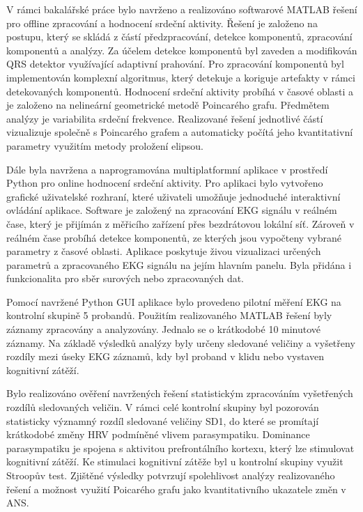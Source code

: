 V rámci bakalářské práce bylo navrženo a realizováno softwarové MATLAB
řešení pro offline zpracování a hodnocení srdeční aktivity. Řešení je založeno
na postupu, který se skládá z částí předzpracování, detekce komponentů,
zpracování komponentů a analýzy. Za účelem detekce komponentů byl zaveden a
modifikován QRS detektor využívající adaptivní prahování. Pro zpracování
komponentů byl implementován komplexní algoritmus, který detekuje a koriguje
artefakty v rámci detekovaných komponentů. Hodnocení srdeční aktivity probíhá v
časové oblasti a je založeno na nelineární geometrické metodě Poincarého grafu.
Předmětem analýzy je variabilita srdeční frekvence. Realizované řešení
jednotlivé částí vizualizuje společně s Poincarého grafem a automaticky počítá
jeho kvantitativní parametry využitím metody proložení elipsou. 

Dále byla navržena a naprogramována multiplatformní aplikace v prostředí Python
pro online hodnocení srdeční aktivity. Pro aplikaci bylo vytvořeno grafické
uživatelské rozhraní, které uživateli umožňuje jednoduché interaktivní ovládání
aplikace. Software je založený na zpracování EKG signálu v reálném čase, který
je přijímán z měřicího zařízení přes bezdrátovou lokální síť. Zároveň v reálném
čase probíhá detekce komponentů, ze kterých jsou vypočteny vybrané parametry 
z časové oblasti. Aplikace poskytuje živou vizualizaci určených parametrů a 
zpracovaného EKG signálu na jejím hlavním panelu. Byla přidána i funkcionalita 
pro sběr surových nebo zpracovaných dat.

Pomocí navržené Python GUI aplikace bylo provedeno pilotní měření EKG na 
kontrolní skupině 5 probandů. Použitím realizovaného MATLAB řešení
byly záznamy zpracovány a analyzovány. Jednalo se o krátkodobé 10 minutové záznamy.
Na základě výsledků analýzy byly určeny sledované veličiny a vyšetřeny rozdíly mezi
úseky EKG záznamů, kdy byl proband v klidu nebo vystaven kognitivní zátěží. 

Bylo realizováno ověření navržených řešení statistickým zpracováním vyšetřených
rozdílů sledovaných veličin. V rámci celé kontrolní skupiny byl pozorován
statisticky významný rozdíl sledované veličiny SD1, do které se promítají
krátkodobé změny HRV podmíněné vlivem parasympatiku. Dominance parasympatiku je
spojena s aktivitou prefrontálního kortexu, který lze stimulovat kognitivní
zátěží. Ke stimulaci kognitivní zátěže byl u kontrolní skupiny využit Stroopův
test. Zjištěné výsledky potvrzují spolehlivost analýzy realizovaného řešení a
možnost využití Poicarého grafu jako kvantitativního ukazatele změn v ANS. 

